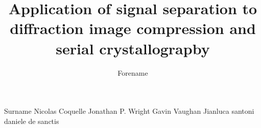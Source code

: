 \documentclass[preprint]{iucr}              %
\begin{document}



\title{Application of signal separation to diffraction image compression and serial crystallograpby}


\author[b]{Forename}{Surname}
Nicolas Coquelle
Jonathan P. Wright
Gavin Vaughan
Jianluca santoni
daniele de sanctis









\end{document}

